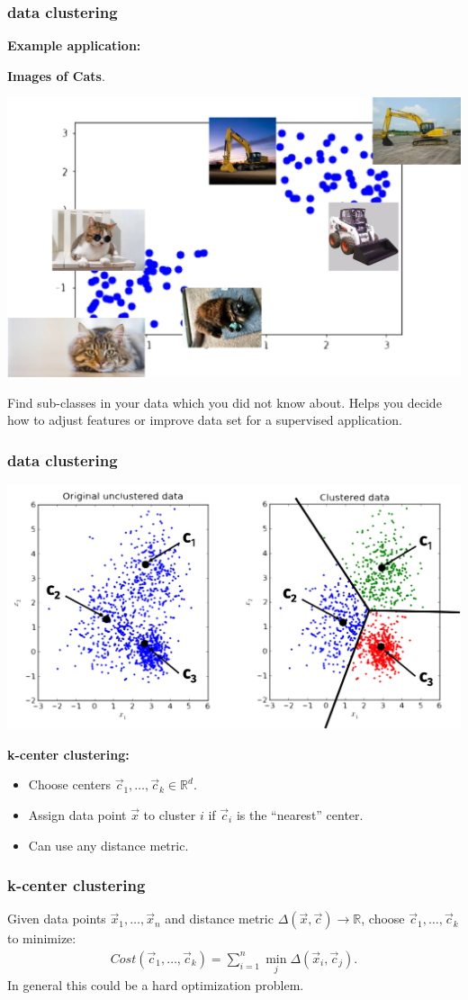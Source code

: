 \documentclass[handout,compress]{beamer}
\newcommand{\R}{\mathbb{R}}
\begin{document}
\begin{frame}
	\frametitle{data clustering}
	\textbf{Example application:}
	\begin{center}
		\textbf{Images of Cats}.\vspace{-.5em}
		
		\includegraphics[width=.65\textwidth]{clustering_use.png}
	\end{center}
	Find sub-classes in your data which you did not know about. Helps you decide how to adjust features or improve data set for a supervised application.
\end{frame}

\begin{frame}
	\frametitle{data clustering}
	\begin{center}
		\includegraphics[width=.8\textwidth]{kcenter_clustering.png}
	\end{center}
	\textbf{k-center clustering:}
	\begin{itemize}
		\item Choose centers $\vec{c}_1, \ldots, \vec{c}_k \in \R^d$. 
		\item Assign data point $\vec{x}$ to cluster $i$ if 
		$\vec{c}_i$ is the ``nearest'' center. 
		\item Can use any distance metric.
	\end{itemize}
\end{frame}

\begin{frame}
	\frametitle{k-center clustering}
	Given data points $\vec{x}_1, \ldots, \vec{x}_n$ and distance metric $\Delta(\vec{x},\vec{c})\rightarrow \R$, choose $\vec{c}_1, \ldots, \vec{c}_k$ to minimize:
	\begin{align*}
	Cost(\vec{c}_1, \ldots, \vec{c}_k) = \sum_{i=1}^n \min_j \Delta(\vec{x}_i,\vec{c}_j).
	\end{align*}
	In general this could be a hard optimization problem.
\end{frame}
\end{document}
